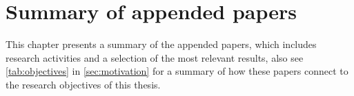 \chapter{Summary of appended papers}\label{ch:results}
\noindent This chapter presents a summary of the appended papers, which includes research activities and a selection of the most relevant results, also see \autoref{tab:objectives} in \autoref{sec:motivation} for a summary of how these papers connect to the research objectives of this thesis.





%





